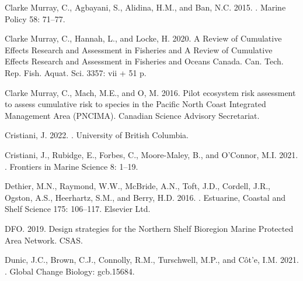 \documentclass[12pt]{article}\usepackage[]{graphicx}\usepackage[]{color}
\begin{document}
\hypertarget{refs}{}
\begin{CSLReferences}{1}{0}
%
Clarke Murray, C., Agbayani, S., Alidina, H.M., and Ban, N.C. 2015. . Marine Policy 58: 71--77.

%
Clarke Murray, C., Hannah, L., and Locke, H. 2020. A {Review} of {Cumulative Effects Research} and {Assessment} in {Fisheries} and {A Review} of {Cumulative Effects Research} and {Assessment} in {Fisheries} and {Oceans Canada}. Can. Tech. Rep. Fish. Aquat. Sci. 3357: vii + 51 p.

%
Clarke Murray, C., Mach, M.E., and O, M. 2016. Pilot ecosystem risk assessment to assess cumulative risk to species in the {Pacific North Coast Integrated Management Area} ({PNCIMA}). Canadian Science Advisory Secretariat.

%
Cristiani, J. 2022. . {University of British Columbia}.

%
Cristiani, J., Rubidge, E., Forbes, C., Moore-Maley, B., and O'Connor, M.I. 2021. . Frontiers in Marine Science 8: 1--19.

%
Dethier, M.N., Raymond, W.W., McBride, A.N., Toft, J.D., Cordell, J.R., Ogston, A.S., Heerhartz, S.M., and Berry, H.D. 2016. . Estuarine, Coastal and Shelf Science 175: 106--117. {Elsevier Ltd}.

%
DFO. 2019. Design strategies for the {Northern Shelf Bioregion Marine Protected Area Network}. CSAS.

%
Dunic, J.C., Brown, C.J., Connolly, R.M., Turschwell, M.P., and Côt'e, I.M. 2021. . Global Change Biology: gcb.15684.


\end{CSLReferences}
\end{document}
